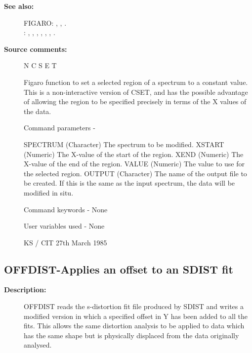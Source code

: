 \begin{description}
\begin{description}
\item [\textbf{See also:}]
FIGARO: , , .\\
: , , , , , , .\\

\item [\textbf{Source comments:}]
\begin{terminalv}
 N C S E T

 Figaro function to set a selected region of a spectrum to a
 constant value.  This is a non-interactive version of CSET,
 and has the possible advantage of allowing the region to be
 specified precisely in terms of the X values of the data.

 Command parameters -

 SPECTRUM    (Character) The spectrum to be modified.
 XSTART      (Numeric) The X-value of the start of the region.
 XEND        (Numeric) The X-value of the end of the region.
 VALUE       (Numeric) The value to use for the selected region.
 OUTPUT      (Character) The name of the output file to
             be created.  If this is the same as the input
             spectrum, the data will be modified in situ.

 Command keywords - None

 User variables used -  None

                                          KS / CIT 27th March 1985
\end{terminalv}
\end{description}
\subsection{OFFDIST-\label{OFFDIST}Applies an offset to an SDIST fit}
\begin{description}

\item [\textbf{Description:}]
 OFFDIST reads the s-distortion fit file produced by SDIST and
 writes a modified version in which a specified offset in Y has
 been added to all the fits.  This allows the same distortion
 analysis to be applied to data which has the same shape but is
 physically displaced from the data originally analysed.


\end{description}
\end{description}
